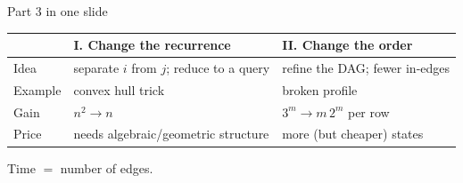 \begin{frame}{Part 3 in one slide}
	\begin{center}
		\begin{tabularx}{\textwidth}{@{}lXX@{}}
			\toprule
			& I. Change the recurrence & II. Change the order\\
			\midrule
			Idea & separate $i$ from $j$; reduce to a query & refine the DAG; fewer in-edges\\
			Example & convex hull trick & broken profile\\
			Gain & $n^2\to n$ & $3^m\to m\,2^m$ per row\\
			Price & needs algebraic/geometric structure & more (but cheaper) states\\
			\bottomrule
		\end{tabularx}
	\end{center}

	\seprule

	Time $=$ number of edges.
\end{frame}
